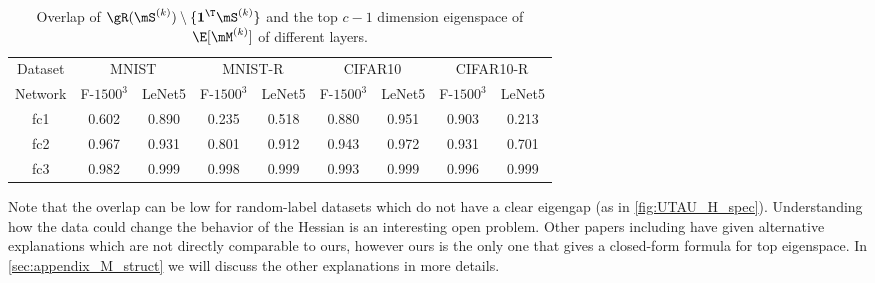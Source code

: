 \begin{table}[H]
\vskip -0.15in
\caption{Overlap of $ \gR(\mS^{(k)})\setminus\{\textbf{1}^\T \mS^{(k)}\}$ and the top $c-1$ dimension eigenspace of $\E[\mM^{(k)}]$ of different layers.}
\vskip 0.1in
\begin{center}
\begin{small}
\begin{tabular}{ccccccccc}
\toprule
Dataset & \multicolumn{2}{c}{MNIST} & \multicolumn{2}{c}{MNIST-R} & \multicolumn{2}{c}{CIFAR10} & \multicolumn{2}{c}{CIFAR10-R} \\
Network & F-$1500^3$    & LeNet5    & F-$1500^3$     & LeNet5     & F-$1500^3$     & LeNet5     & F-$1500^3$      & LeNet5     \\ \midrule
fc1     & 0.602         & 0.890     & 0.235          & 0.518      & 0.880          & 0.951      & 0.903           & 0.213       \\
fc2     & 0.967         & 0.931     & 0.801          & 0.912      & 0.943          & 0.972      & 0.931           & 0.701       \\
fc3     & 0.982         & 0.999     & 0.998          & 0.999      & 0.993          & 0.999      & 0.996           & 0.999     \\ \bottomrule
\end{tabular}
\end{small}
\end{center}
\label{tab:approx-m}
\vskip -0.15in
\end{table}
Note that the overlap can be low for random-label datasets which do not have a clear eigengap (as in \cref{fig:UTAU_H_spec}). Understanding how the data could change the behavior of the Hessian is an interesting open problem. Other papers including \citet{papyan2019measurements} have given alternative explanations which are not directly comparable to ours, however ours is the only one that gives a closed-form formula for top eigenspace. In \cref{sec:appendix_M_struct} we will discuss the other explanations in more details.